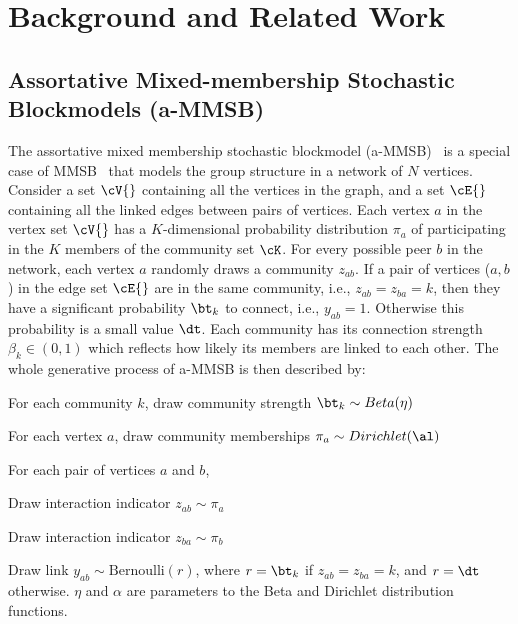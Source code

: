 
\newcommand{\Vertices}{\ensuremath{\cV{}}\xspace}
\newcommand{\Edges}{\ensuremath{\cE{}}\xspace}
\newcommand{\Heldout}{\ensuremath{\cE_h{}}\xspace}
\newcommand{\SGLDMinibatch}{\ensuremath{\cD_n{}}\xspace}
\newcommand{\Minibatch}{\ensuremath{\cE_n{}}\xspace}
\newcommand{\Minibatcht}{\ensuremath{\cE_n{}}\xspace}
\newcommand{\Neighbors}{\ensuremath{\cV_n{}}\xspace}

\section{Background and Related Work}
\label{sec-background}

\subsection{Assortative Mixed-membership Stochastic Blockmodels (a-MMSB)}
The assortative mixed membership stochastic blockmodel (a-MMSB)~\cite{gopalan2012scalable} is a special case of MMSB~\cite{airoldi2009mixed} that models the group structure in a network of $N$ vertices. Consider a set  \Vertices containing all the vertices in the graph, and a set \Edges containing all the linked edges between pairs of vertices. Each vertex $a$ in the vertex set \Vertices has a $K$-dimensional probability distribution $\pi_a$ of participating in the $K$ members of the community set $\cK$.  For every possible peer $b$ in the network, each vertex $a$ randomly draws a community $z_{ab}$. If a pair of vertices ($a,b$) in the edge set \Edges are in the same community, i.e., $z_{ab}=z_{ba} = k$, then they have a significant probability $\bt_k$ to connect, i.e., $y_{ab}=1$. Otherwise this probability is a small value $\dt$. Each community has its connection strength $\beta_{k} \in (0,1)$ which reflects how likely its members are linked to each other. The whole generative process of a-MMSB is then described by:
\benum
\item For each community $k$, draw community strength $\bt_k \sim \mbox{Beta}(\eta)$
\item For each vertex $a$, draw community memberships $\pi_a \sim \mbox{Dirichlet}(\al)$
\item For each pair of vertices $a$ and $b$,
\benum
	\item Draw interaction indicator $z_{ab} \sim \pi_a$
    \item Draw interaction indicator $z_{ba} \sim \pi_b$
    \item Draw link $y_{ab} \sim \mbox{Bernoulli}(r)$, where $r = \bt_k$ if $z_{ab}=z_{ba}=k$, and $r=\dt$ otherwise.
\eenum
\eenum
$\eta$ and $\alpha$ are parameters to the Beta and Dirichlet distribution functions.

